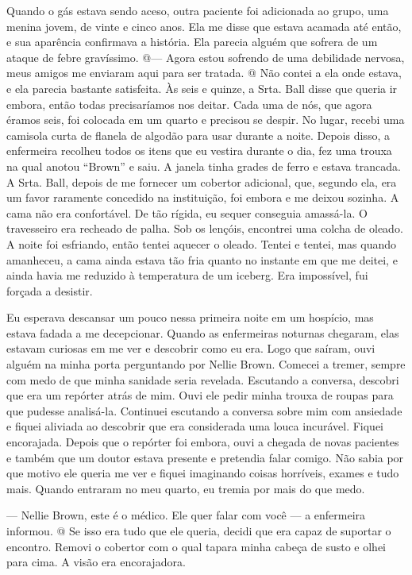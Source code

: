 Quando o gás estava sendo aceso, outra paciente foi adicionada ao grupo,
uma menina jovem, de vinte e cinco anos. Ela me disse que estava acamada
até então, e sua aparência confirmava a história. Ela parecia alguém que
sofrera de um ataque de febre gravíssimo. @--- Agora estou sofrendo de
uma debilidade nervosa, meus amigos me enviaram aqui para ser tratada. @
Não contei a ela onde estava, e ela parecia bastante satisfeita. Às seis
e quinze, a Srta. Ball disse que queria ir embora, então todas
precisaríamos nos deitar. Cada uma de nós, que agora éramos seis, foi
colocada em um quarto e precisou se despir. No lugar, recebi uma
camisola curta de flanela de algodão para usar durante a noite. Depois
disso, a enfermeira recolheu todos os itens que eu vestira durante o
dia, fez uma trouxa na qual anotou ``Brown'' e saiu. A janela tinha
grades de ferro e estava trancada. A Srta. Ball, depois de me fornecer
um cobertor adicional, que, segundo ela, era um favor raramente
concedido na instituição, foi embora e me deixou sozinha. A cama não era
confortável. De tão rígida, eu sequer conseguia amassá-la. O travesseiro
era recheado de palha. Sob os lençóis, encontrei uma colcha de oleado. A
noite foi esfriando, então tentei aquecer o oleado. Tentei e tentei, mas
quando amanheceu, a cama ainda estava tão fria quanto no instante em que
me deitei, e ainda havia me reduzido à temperatura de um iceberg. Era
impossível, fui forçada a desistir.

Eu esperava descansar um pouco nessa primeira noite em um hospício, mas
estava fadada a me decepcionar. Quando as enfermeiras noturnas chegaram,
elas estavam curiosas em me ver e descobrir como eu era. Logo que
saíram, ouvi alguém na minha porta perguntando por Nellie Brown. Comecei
a tremer, sempre com medo de que minha sanidade seria revelada.
Escutando a conversa, descobri que era um repórter atrás de mim. Ouvi
ele pedir minha trouxa de roupas para que pudesse analisá-la. Continuei
escutando a conversa sobre mim com ansiedade e fiquei aliviada ao
descobrir que era considerada uma louca incurável. Fiquei encorajada.
Depois que o repórter foi embora, ouvi a chegada de novas pacientes e
também que um doutor estava presente e pretendia falar comigo. Não sabia
por que motivo ele queria me ver e fiquei imaginando coisas horríveis,
exames e tudo mais. Quando entraram no meu quarto, eu tremia por mais do
que medo.

--- Nellie Brown, este é o médico. Ele quer falar com você --- a
enfermeira informou. @ Se isso era tudo que ele queria, decidi que era
capaz de suportar o encontro. Removi o cobertor com o qual tapara minha
cabeça de susto e olhei para cima. A visão era encorajadora.

